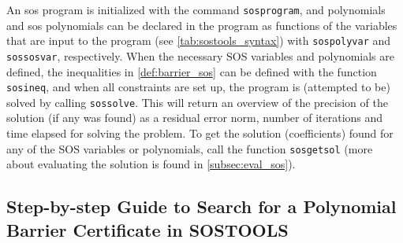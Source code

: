 \vspace{-2mm}
An \gls{sos} program is initialized with the command \texttt{sosprogram}, and polynomials and \gls{sos} polynomials can be declared in the program as functions of the variables that are input to the program (see \autoref{tab:sostools_syntax}) with \texttt{sospolyvar} and \texttt{sossosvar}, respectively.
%
%
When the necessary SOS variables and polynomials are defined, the inequalities in \autoref{def:barrier_sos} can be defined with the function \texttt{sosineq}, and when all constraints are set up, the program is (attempted to be) solved by calling \texttt{sossolve}. This will return an overview of the precision of the solution (if any was found) as a residual error norm, number of iterations and time elapsed for solving the problem. To get the solution (coefficients) found for any of the SOS variables or polynomials, call the function \texttt{sosgetsol} (more about evaluating the solution is found in \autoref{subsec:eval_sos}).






\subsection{Step-by-step Guide to Search for a Polynomial Barrier Certificate in SOSTOOLS}\label{sec:app_sostools_barrier_search}
\vspace{-2mm}

